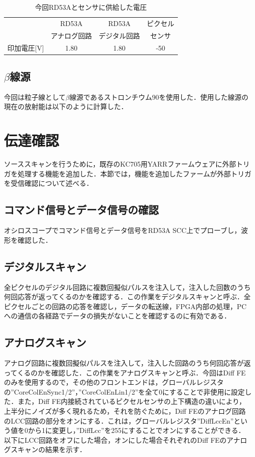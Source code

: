 \begin{table}[h]
  \centering
  \caption{今回RD53Aとセンサに供給した電圧}
  \begin{tabular} {|l|cc|c|} \hline
     & RD53A & RD53A & ピクセル \\ 
     & アナログ回路 & デジタル回路 & センサ \\ \hline
    印加電圧[$\mathrm{V}$] & 1.80 & 1.80 & -50 \\ \hline
  \end{tabular}
  \label{tab:voltage}
\end{table}


\subsection*{$\beta$線源}
今回は粒子線として$\beta$線源であるストロンチウム90を使用した．使用した線源の現在の放射能は以下のように計算した．

\section{伝達確認}
ソーススキャンを行うために，既存のKC705用YARRファームウェアに外部トリガを処理する機能を追加した．本節では，機能を追加したファームが外部トリガを受信確認について述べる．

\subsection{コマンド信号とデータ信号の確認}
オシロスコープでコマンド信号とデータ信号をRD53A SCC上でプローブし，波形を確認した．

\subsection{デジタルスキャン}
全ピクセルのデジタル回路に複数回擬似パルスを注入して，注入した回数のうち何回応答が返ってくるのかを確認する．この作業をデジタルスキャンと呼ぶ．全ピクセルごとの回路の応答を確認し，データの転送線，FPGA内部の処理，PCへの通信の各経路でデータの損失がないことを確認するのに有効である．

\subsection{アナログスキャン}
アナログ回路に複数回擬似パルスを注入して，注入した回路のうち何回応答が返ってくるのかを確認した．この作業をアナログスキャンと呼ぶ．今回はDiff FEのみを使用するので，その他のフロントエンドは，グローバルレジスタの''CoreColEnSync1/2''，''CoreColEnLin1/2''を全て0にすることで非使用に設定した．また，Diff FE内接続されているピクセルセンサの上下構造の違いにより，上半分にノイズが多く現れるため，それを防ぐために，Diff FEのアナログ回路のLCC回路の部分をオンにする．これは，グローバルレジスタ''DiffLccEn''という値を0から1に変更し，''DiffLcc''を255にすることでオンにすることができる．以下にLCC回路をオフにした場合，オンにした場合それぞれのDiff FEのアナログスキャンの結果を示す．

